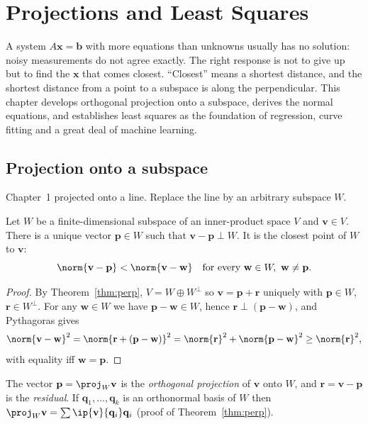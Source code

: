 \chapter{Projections and Least Squares}

A system $A\mathbf{x}=\mathbf{b}$ with more equations than unknowns usually has no solution: noisy measurements do not agree exactly. The right response is not to give up but to find the $\mathbf{x}$ that comes closest. ``Closest'' means a shortest distance, and the shortest distance from a point to a subspace is along the perpendicular. This chapter develops orthogonal projection onto a subspace, derives the normal equations, and establishes least squares as the foundation of regression, curve fitting and a great deal of machine learning.

\section{Projection onto a subspace}

Chapter~1 projected onto a line. Replace the line by an arbitrary subspace $W$.

\begin{theorem}\label{thm:bestapprox}
Let $W$ be a finite-dimensional subspace of an inner-product space $V$ and $\mathbf{v}\in V$. There is a unique vector $\mathbf{p}\in W$ such that $\mathbf{v}-\mathbf{p}\perp W$. It is the closest point of $W$ to $\mathbf{v}$:
\[ \norm{\mathbf{v}-\mathbf{p}}<\norm{\mathbf{v}-\mathbf{w}}\quad\text{for every }\mathbf{w}\in W,\ \mathbf{w}\ne\mathbf{p}. \]
\end{theorem}

\begin{proof}
By Theorem~\ref{thm:perp}, $V=W\oplus W^\perp$ so $\mathbf{v}=\mathbf{p}+\mathbf{r}$ uniquely with $\mathbf{p}\in W$, $\mathbf{r}\in W^\perp$. For any $\mathbf{w}\in W$ we have $\mathbf{p}-\mathbf{w}\in W$, hence $\mathbf{r}\perp(\mathbf{p}-\mathbf{w})$, and Pythagoras gives
\[ \norm{\mathbf{v}-\mathbf{w}}^2=\norm{\mathbf{r}+(\mathbf{p}-\mathbf{w})}^2=\norm{\mathbf{r}}^2+\norm{\mathbf{p}-\mathbf{w}}^2\ge\norm{\mathbf{r}}^2, \]
with equality iff $\mathbf{w}=\mathbf{p}$.
\end{proof}

The vector $\mathbf{p}=\proj_W\mathbf{v}$ is the \emph{orthogonal projection} of $\mathbf{v}$ onto $W$, and $\mathbf{r}=\mathbf{v}-\mathbf{p}$ is the \emph{residual}. If $\mathbf{q}_1,\dots,\mathbf{q}_k$ is an orthonormal basis of $W$ then $\proj_W\mathbf{v}=\sum\ip{\mathbf{v}}{\mathbf{q}_i}\mathbf{q}_i$ (proof of Theorem~\ref{thm:perp}).

